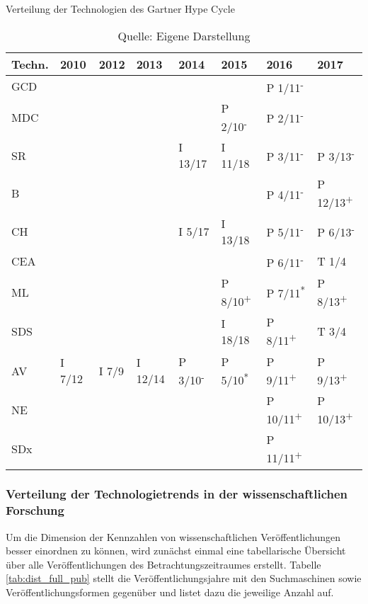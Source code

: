 \begin{table}
	\caption{Verteilung der Technologien des \glqq Gartner Hype Cycle\grqq}
	\selectfont
	\scriptsize
	\centering
	\label{tab:dist_ghc}
	\begin{tabularx}{\linewidth}{XXXXXXXX}
		Techn. & 2010 & 2012 & 2013 & 2014 & 2015 & 2016 & 2017 \\
		\hline
		GCD &  &  &  &  &  & P 1/11\textsuperscript{-} &  \\
		MDC &  &  &  &  & P 2/10\textsuperscript{-} & P 2/11\textsuperscript{-} &  \\
		SR &  &  &  & I 13/17 & I 11/18 & P 3/11\textsuperscript{-} & P 3/13\textsuperscript{-} \\
		B &  &  &  &  &  & P 4/11\textsuperscript{-} & P 12/13\textsuperscript{+} \\
		CH &  &  &  & I 5/17 & I 13/18 & P 5/11\textsuperscript{-} & P 6/13\textsuperscript{-} \\
		CEA &  &  &  &  &  & P 6/11\textsuperscript{-} & T 1/4 \\
		ML &  &  &  &  & P 8/10\textsuperscript{+} & P 7/11\textsuperscript{*} & P 8/13\textsuperscript{+} \\
		SDS &  &  &  &  & I 18/18 & P 8/11\textsuperscript{+} & T 3/4 \\
		AV & I 7/12 & I 7/9 & I 12/14 & P 3/10\textsuperscript{-} & P 5/10\textsuperscript{*} & P 9/11\textsuperscript{+} & P 9/13\textsuperscript{+} \\
		NE &  &  &  &  &  & P 10/11\textsuperscript{+} & P 10/13\textsuperscript{+} \\
		SDx &  &  &  &  &  & P 11/11\textsuperscript{+} &  \\
		\hline
	\end{tabularx}
\caption*{Quelle: Eigene Darstellung}
\end{table}

\subsubsection{Verteilung der Technologietrends in der wissenschaftlichen Forschung}
Um die Dimension der Kennzahlen von wissenschaftlichen Veröffentlichungen besser einordnen zu können, wird zunächst einmal eine tabellarische Übersicht über alle Veröffentlichungen des Betrachtungszeitraumes erstellt. Tabelle \ref{tab:dist_full_pub} stellt die Veröffentlichungsjahre mit den Suchmaschinen sowie Veröffentlichungsformen gegenüber und listet dazu die jeweilige Anzahl auf.

